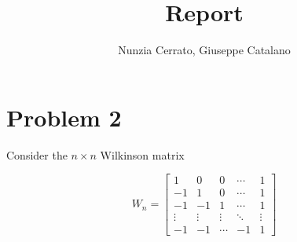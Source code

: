 \documentclass[a4paper]{report}
\numberwithin{equation}{chapter}
\begin{document}
	\author{Nunzia Cerrato, Giuseppe Catalano}
	\title{Report}
	\date{}
	\maketitle         
	
\section*{Problem 2}
Consider the $n \times n$ Wilkinson matrix

\begin{equation}\label{key}
	W_n = 
\begin{bmatrix}
	1 & 0  & 0  & \cdots  & 1  \\
	-1 & 1 & 0 & \cdots & 1 \\
	-1 & -1 & 1 & \cdots & 1 \\
	\vdots & \vdots & \vdots & \ddots & \vdots \\
	-1 & -1 & \cdots & -1 & 1 
\end{bmatrix}
\end{equation}
\end{document}
